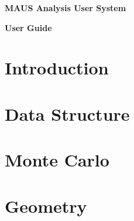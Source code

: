 \documentclass[a4paper, 10pt] {report}
\begin{document}
\vspace*{2.0cm}

\begin{center}
\Large{ \bf{MAUS Analysis User System} }

\Large{ \bf{User Guide} }
\end{center}

\tableofcontents

\newpage

\chapter{Introduction}


\chapter{Data Structure}


\chapter{Monte Carlo}


\chapter{Geometry}


%
%
%
%
%

%


\end{document}
